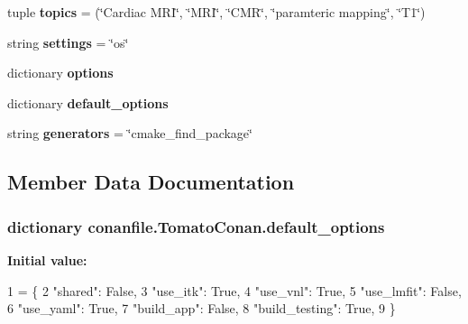 \begin{DoxyCompactItemize}
\item 
tuple {\bfseries topics} = (\char`\"{}Cardiac M\+RI\char`\"{}, \char`\"{}M\+RI\char`\"{}, \char`\"{}C\+MR\char`\"{}, \char`\"{}paramteric mapping\char`\"{}, \char`\"{}T1\char`\"{})\hypertarget{classconanfile_1_1_tomato_conan_ae313448f5395ee58ba9a85a7ca82c23c}{}\label{classconanfile_1_1_tomato_conan_ae313448f5395ee58ba9a85a7ca82c23c}

\item 
string {\bfseries settings} = \char`\"{}os\char`\"{}\hypertarget{classconanfile_1_1_tomato_conan_a6d2ca4c580877cac66ca1341ca2ca85a}{}\label{classconanfile_1_1_tomato_conan_a6d2ca4c580877cac66ca1341ca2ca85a}

\item 
dictionary {\bfseries options}
\item 
dictionary {\bfseries default\+\_\+options}
\item 
string {\bfseries generators} = \char`\"{}cmake\+\_\+find\+\_\+package\char`\"{}\hypertarget{classconanfile_1_1_tomato_conan_af526159a57c62a54d1b00aa7b6b16e1a}{}\label{classconanfile_1_1_tomato_conan_af526159a57c62a54d1b00aa7b6b16e1a}

\end{DoxyCompactItemize}


\subsection{Member Data Documentation}
\subsubsection[{\texorpdfstring{default\+\_\+options}{default_options}}]{\setlength{\rightskip}{0pt plus 5cm}dictionary conanfile.\+Tomato\+Conan.\+default\+\_\+options\hspace{0.3cm}{\ttfamily [static]}}\hypertarget{classconanfile_1_1_tomato_conan_a29503a3b385bfdc7deb5dc266624b630}{}\label{classconanfile_1_1_tomato_conan_a29503a3b385bfdc7deb5dc266624b630}
{\bfseries Initial value\+:}
\begin{DoxyCode}
1 = \{
2         \textcolor{stringliteral}{"shared"}: \textcolor{keyword}{False},
3         \textcolor{stringliteral}{"use\_itk"}: \textcolor{keyword}{True},
4         \textcolor{stringliteral}{"use\_vnl"}: \textcolor{keyword}{True},
5         \textcolor{stringliteral}{"use\_lmfit"}: \textcolor{keyword}{False},
6         \textcolor{stringliteral}{"use\_yaml"}: \textcolor{keyword}{True},
7         \textcolor{stringliteral}{"build\_app"}: \textcolor{keyword}{False},
8         \textcolor{stringliteral}{"build\_testing"}: \textcolor{keyword}{True},
9     \}
\end{DoxyCode}
